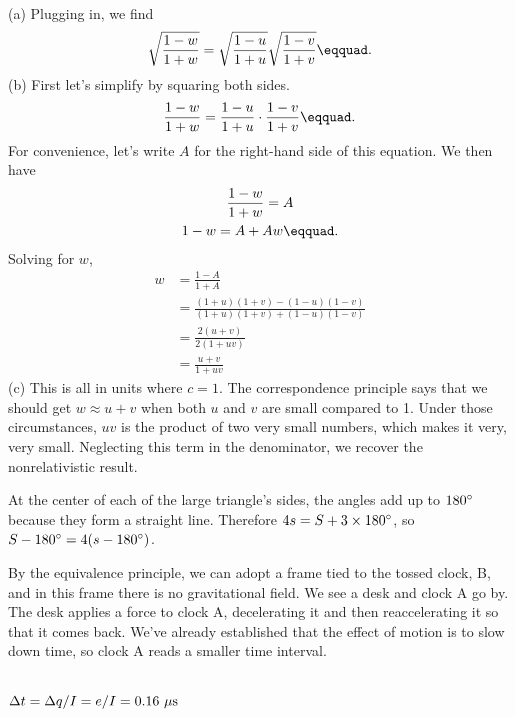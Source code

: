 \noindent{}\\
(a) Plugging in, we find
\begin{equation*}
  \sqrt{\frac{1-w}{1+w}} =   \sqrt{\frac{1-u}{1+u}}   \sqrt{\frac{1-v}{1+v}}\eqquad.
\end{equation*}
(b) First let's simplify by squaring both sides.
\begin{equation*}
  \frac{1-w}{1+w} =   \frac{1-u}{1+u}  \cdot \frac{1-v}{1+v}\eqquad.
\end{equation*}
For convenience, let's write $A$ for the right-hand side of this equation. We then have
\begin{gather*}
  \frac{1-w}{1+w} = A \\
  1-w = A+Aw\eqquad.
\end{gather*}
Solving for $w$,
\begin{align*}
  w &= \frac{1-A}{1+A} \\
    &= \frac{(1+u)(1+v)-(1-u)(1-v)}{(1+u)(1+v)+(1-u)(1-v)} \\
    &= \frac{2(u+v)}{2(1+uv)} \\
    &= \frac{u+v}{1+uv}
\end{align*}
(c) This is all in units where $c=1$. The correspondence principle says that we should get $w\approx u+v$ when
both $u$ and $v$ are small compared to 1. Under those circumstances, $uv$ is the product of two very small
numbers, which makes it very, very small. Neglecting this term in the denominator, we recover the nonrelativistic result.


      At the center of each of the
      large triangle's sides, the angles add up to $180\mspace{0mu}^\circ$ because they form a straight line. Therefore $4s=S+3\times180\mspace{0mu}^\circ$,
      so $S-180\mspace{0mu}^\circ=4(s-180\mspace{0mu}^\circ)$.

By the equivalence principle, we can adopt a frame tied to the tossed clock, B, and in this
frame there is no gravitational field. We see a desk and clock A go by. The desk applies
a force to clock A, decelerating it and then reaccelerating it so that it comes back.
We've already established that the effect of motion is to slow down time, so clock
A reads a smaller time interval.

\noindent{}\\
$\Delta t = \Delta q / I = e/I = 0.16\ \mu \textup{s}$


